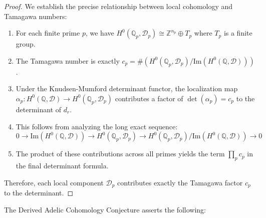 \documentclass{article}
\theoremstyle{plain}
\theoremstyle{definition}
\theoremstyle{remark}
\begin{document}
\begin{proof}
We establish the precise relationship between local cohomology and Tamagawa numbers:

\begin{enumerate}
\item For each finite prime $p$, we have $H^0(\mathbb{Q}_p, \mathcal{D}_p) \cong \mathbb{Z}^{n_p} \oplus T_p$ where $T_p$ is a finite group.

\item The Tamagawa number is exactly $c_p = \#(H^0(\mathbb{Q}_p, \mathcal{D}_p)/\text{Im}(H^0(\mathbb{Q}, \mathcal{D})))$.

\item Under the Knudsen-Mumford determinant functor, the localization map $\alpha_p: H^0(\mathbb{Q}, \mathcal{D}) \to H^0(\mathbb{Q}_p, \mathcal{D}_p)$ contributes a factor of $\det(\alpha_p) = c_p$ to the determinant of $d_r$.

\item This follows from analyzing the long exact sequence:
\[
0 \to \text{Im}(H^0(\mathbb{Q}, \mathcal{D})) \to H^0(\mathbb{Q}_p, \mathcal{D}_p) \to 
H^0(\mathbb{Q}_p, \mathcal{D}_p)/\text{Im}(H^0(\mathbb{Q}, \mathcal{D})) \to 0
\]

\item The product of these contributions across all primes yields the term $\prod_p c_p$ in the final determinant formula.
\end{enumerate}

Therefore, each local component $\mathcal{D}_p$ contributes exactly the Tamagawa factor $c_p$ to the determinant.
\end{proof}

The Derived Adelic Cohomology Conjecture asserts the following:
\end{document}
